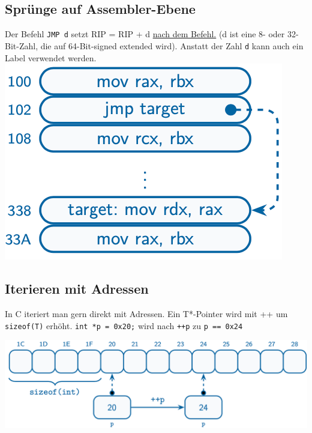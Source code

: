\documentclass[8pt,landscape,a4paper]{scrartcl}
\begin{document}
\begin{multicols*}{5}
\subsection{Sprünge auf Assembler-Ebene}
\begin{multicols}{2}
	Der Befehl \texttt{JMP d} setzt RIP = RIP + d \underline{nach dem Befehl.} (d ist eine 8- oder 32-Bit-Zahl, die auf 64-Bit-signed extended wird). Anstatt der Zahl \texttt{d} kann auch ein Label verwendet werden.
	\includegraphics[scale=.34]{Graphic/RelativeSpruenge}
\end{multicols}

\subsection{Iterieren mit Adressen}
In C iteriert man gern direkt mit Adressen. Ein T*-Pointer wird mit ++ um \texttt{sizeof(T)} erhöht. \texttt{int *p = 0x20;} wird nach \texttt{++p} zu \texttt{p == 0x24}
\begin{center}
	
	\includegraphics[scale=.27]{Graphic/IterierenAddr}
	
\end{center}







\end{multicols*}
\end{document}
